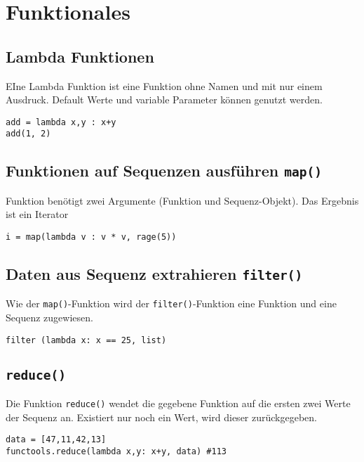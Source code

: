 \chapter{Funktionales}
\section{Lambda Funktionen}
EIne Lambda Funktion ist eine Funktion ohne Namen und mit nur einem Ausdruck. Default Werte und variable Parameter können genutzt werden.
\begin{lstlisting}
add = lambda x,y : x+y
add(1, 2)
\end{lstlisting}
\section{Funktionen auf Sequenzen ausführen \texttt{map()}}
Funktion benötigt zwei Argumente (Funktion und Sequenz-Objekt). Das Ergebnis ist ein Iterator
\begin{lstlisting}
i = map(lambda v : v * v, rage(5))
\end{lstlisting}
\section{Daten aus Sequenz extrahieren \texttt{filter()}}
Wie der \texttt{map()}-Funktion wird der \texttt{filter()}-Funktion eine Funktion und eine Sequenz zugewiesen.
\begin{lstlisting}
filter (lambda x: x == 25, list)
\end{lstlisting}
\section{\texttt{reduce()}}
Die Funktion \texttt{reduce()} wendet die gegebene Funktion auf die ersten zwei Werte der Sequenz an. Existiert nur noch ein Wert, wird dieser zurückgegeben.
\begin{lstlisting}
data = [47,11,42,13]
functools.reduce(lambda x,y: x+y, data) #113
\end{lstlisting}

